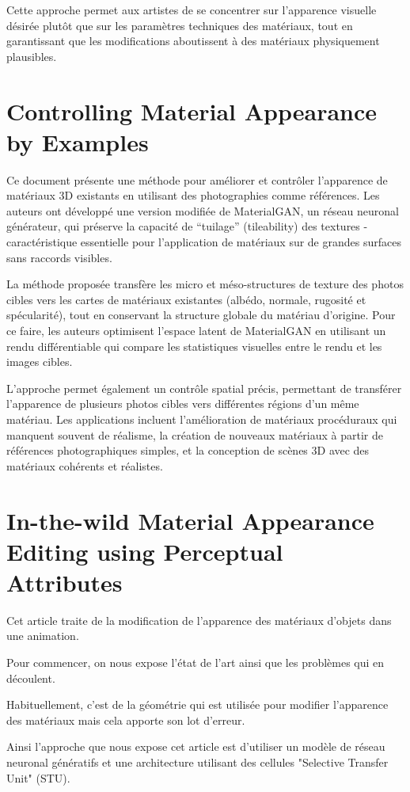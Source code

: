 \documentclass[runningheads]{llncs}
\begin{document}
Cette approche permet aux artistes de se concentrer sur l'apparence visuelle désirée plutôt que sur les paramètres techniques des matériaux, tout en garantissant que les modifications aboutissent à des matériaux physiquement plausibles.

\section{Controlling Material Appearance by Examples}
Ce document présente une méthode pour améliorer et contrôler l'apparence de matériaux 3D existants en utilisant des photographies comme références. Les auteurs ont développé une version modifiée de MaterialGAN, un réseau neuronal générateur, qui préserve la capacité de ``tuilage'' (tileability) des textures - caractéristique essentielle pour l'application de matériaux sur de grandes surfaces sans raccords visibles.

La méthode proposée transfère les micro et méso-structures de texture des photos cibles vers les cartes de matériaux existantes (albédo, normale, rugosité et spécularité), tout en conservant la structure globale du matériau d'origine. Pour ce faire, les auteurs optimisent l'espace latent de MaterialGAN en utilisant un rendu différentiable qui compare les statistiques visuelles entre le rendu et les images cibles.

L'approche permet également un contrôle spatial précis, permettant de transférer l'apparence de plusieurs photos cibles vers différentes régions d'un même matériau. Les applications incluent l'amélioration de matériaux procéduraux qui manquent souvent de réalisme, la création de nouveaux matériaux à partir de références photographiques simples, et la conception de scènes 3D avec des matériaux cohérents et réalistes.

\newpage
\section{In-the-wild Material Appearance Editing using Perceptual Attributes}
Cet article traite de la modification de l’apparence des matériaux d’objets dans une animation.

Pour commencer, on nous expose l’état de l’art ainsi que les problèmes qui en découlent.

Habituellement, c’est de la géométrie qui est utilisée pour modifier l’apparence des matériaux mais cela apporte son lot d’erreur.

Ainsi l’approche que nous expose cet article est d’utiliser un modèle de réseau neuronal génératifs et une architecture utilisant des cellules "Selective Transfer Unit" (STU).
\end{document}
